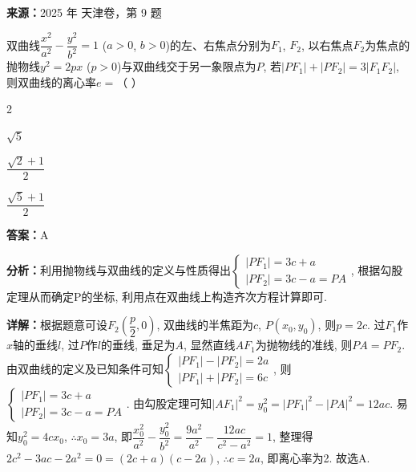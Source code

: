 \begin{question}[points=5]
\textbf{来源：}2025 年 天津卷，第 9 题\par
双曲线$\dfrac{x^2}{a^2} - \dfrac{y^2}{b^2} = 1$ ($a > 0$, $b > 0$)的左、右焦点分别为$F_1$, $F_2$, 以右焦点$F_2$为焦点的抛物线$y^2 = 2px$ ($p > 0$)与双曲线交于另一象限点为$P$, 若$|PF_1| + |PF_2| = 3|F_1F_2|$, 则双曲线的离心率$e = $（   ）
\begin{choices}
  \item 2
  \item $\sqrt{5}$
  \item $\dfrac{\sqrt{2}+1}{2}$
  \item $\dfrac{\sqrt{5}+1}{2}$
\end{choices}
\begin{solution}
\textbf{答案：}A

\textbf{分析：}利用抛物线与双曲线的定义与性质得出$\begin{cases} |PF_1| = 3c + a \\ |PF_2| = 3c - a = PA \end{cases}$, 根据勾股定理从而确定P的坐标, 利用点在双曲线上构造齐次方程计算即可.

\textbf{详解：}根据题意可设$F_2\left( \dfrac{p}{2}, 0 \right)$, 双曲线的半焦距为$c$, $P(x_0, y_0)$, 则$p = 2c$. 过$F_1$作$x$轴的垂线$l$, 过$P$作$l$的垂线, 垂足为$A$, 显然直线$AF_1$为抛物线的准线, 则$PA = PF_2$. 由双曲线的定义及已知条件可知$\begin{cases} |PF_1| - |PF_2| = 2a \\ |PF_1| + |PF_2| = 6c \end{cases}$, 则$\begin{cases} |PF_1| = 3c + a \\ |PF_2| = 3c - a = PA \end{cases}$. 由勾股定理可知$|AF_1|^2 = y_0^2 = |PF_1|^2 - |PA|^2 = 12ac$. 易知$y_0^2 = 4cx_0$, $\therefore x_0 = 3a$, 即$\dfrac{x_0^2}{a^2} - \dfrac{y_0^2}{b^2} = \dfrac{9a^2}{a^2} - \dfrac{12ac}{c^2 - a^2} = 1$, 整理得$2c^2 - 3ac - 2a^2 = 0 = (2c + a)(c - 2a)$, $\therefore c = 2a$, 即离心率为2. 故选A.
\end{solution}
\end{question}

